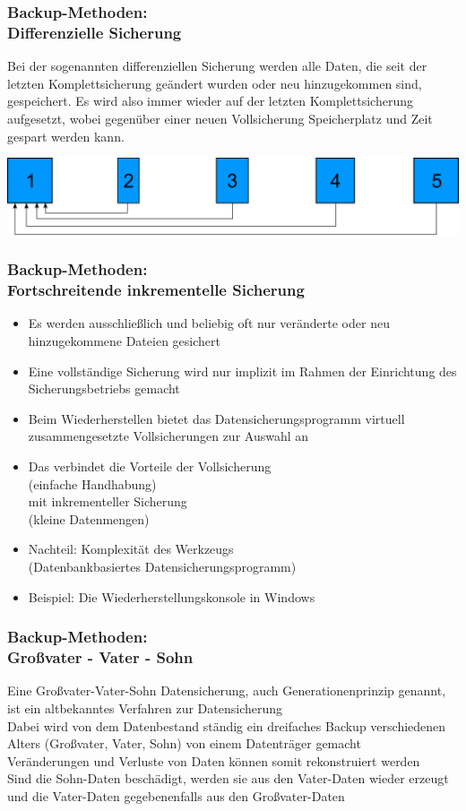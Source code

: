 \begin{frame}
  \frametitle{Backup-Methoden:\\Differenzielle Sicherung}
  \pause
  Bei der sogenannten differenziellen Sicherung werden alle Daten, die seit der letzten Komplettsicherung geändert wurden oder neu hinzugekommen sind, gespeichert. Es wird also immer wieder auf der letzten Komplettsicherung aufgesetzt, wobei gegenüber einer neuen Vollsicherung Speicherplatz und Zeit gespart werden kann.
  \pause
  \vspace{10mm}
  \begin{center}
    \includegraphics[width=0.9\linewidth]{Bilder/DifferenziellesBackup}
  \end{center}
\end{frame}

\begin{frame}
  \frametitle{Backup-Methoden:\\Fortschreitende inkrementelle Sicherung}
  \pause
  \begin{itemize}
    \item Es werden ausschließlich und beliebig oft nur veränderte oder neu hinzugekommene Dateien gesichert
    \item Eine vollständige Sicherung wird nur implizit im Rahmen der Einrichtung des Sicherungsbetriebs gemacht
    \item Beim Wiederherstellen bietet das Datensicherungsprogramm virtuell zusammengesetzte Vollsicherungen zur Auswahl an
    \item Das verbindet die Vorteile der Vollsicherung\\(einfache Handhabung)\\mit inkrementeller Sicherung\\(kleine Datenmengen)
    \item Nachteil: Komplexität des Werkzeugs\\(Datenbankbasiertes Datensicherungsprogramm)
    \item Beispiel: Die Wiederherstellungskonsole in Windows
  \end{itemize}
\end{frame}

\begin{frame}
  \frametitle{Backup-Methoden:\\Großvater - Vater - Sohn}
  \pause
  Eine Großvater-Vater-Sohn Datensicherung, auch Generationenprinzip genannt, ist ein altbekanntes Verfahren zur Datensicherung\\
  \pause
  Dabei wird von dem Datenbestand ständig ein dreifaches Backup verschiedenen Alters (Großvater, Vater, Sohn) von einem Datenträger gemacht\\
  \pause
  Veränderungen und Verluste von Daten können somit rekonstruiert werden\\
  \pause
  Sind die Sohn-Daten beschädigt, werden sie aus den Vater-Daten wieder erzeugt und die Vater-Daten gegebenenfalls aus den Großvater-Daten
\end{frame}

